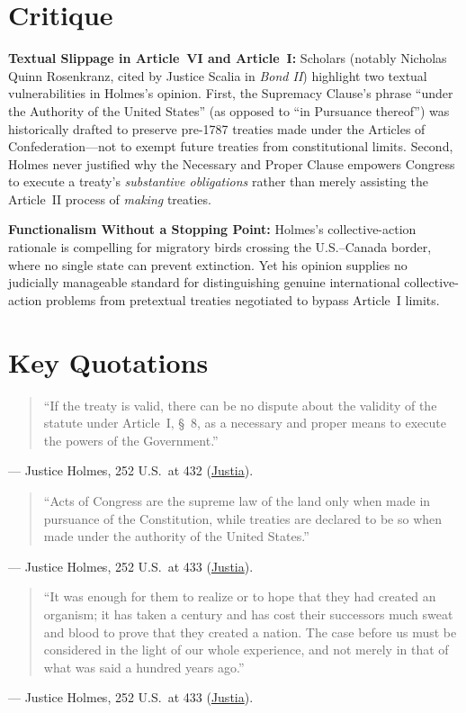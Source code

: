 \documentclass[12pt]{article}
\begin{document}
\section{Critique}
\textbf{Textual Slippage in Article~VI and Article~I:} Scholars (notably Nicholas Quinn Rosenkranz, cited by Justice Scalia in \textit{Bond II}) highlight two textual vulnerabilities in Holmes's opinion. First, the Supremacy Clause's phrase ``under the Authority of the United States'' (as opposed to ``in Pursuance thereof'') was historically drafted to preserve pre-1787 treaties made under the Articles of Confederation---not to exempt future treaties from constitutional limits. Second, Holmes never justified why the Necessary and Proper Clause empowers Congress to execute a treaty's \textit{substantive obligations} rather than merely assisting the Article~II process of \textit{making} treaties.

\textbf{Functionalism Without a Stopping Point:} Holmes's collective-action rationale is compelling for migratory birds crossing the U.S.--Canada border, where no single state can prevent extinction. Yet his opinion supplies no judicially manageable standard for distinguishing genuine international collective-action problems from pretextual treaties negotiated to bypass Article~I limits.

\section{Key Quotations}
\begin{quote}
``If the treaty is valid, there can be no dispute about the validity of the statute under Article~I, \S~8, as a necessary and proper means to execute the powers of the Government.''
\end{quote}
\noindent --- Justice Holmes, 252 U.S.\ at 432 (\href{https://supreme.justia.com/cases/federal/us/252/416/}{Justia}).

\begin{quote}
``Acts of Congress are the supreme law of the land only when made in pursuance of the Constitution, while treaties are declared to be so when made under the authority of the United States.''
\end{quote}
\noindent --- Justice Holmes, 252 U.S.\ at 433 (\href{https://supreme.justia.com/cases/federal/us/252/416/}{Justia}).

\begin{quote}
``It was enough for them to realize or to hope that they had created an organism; it has taken a century and has cost their successors much sweat and blood to prove that they created a nation. The case before us must be considered in the light of our whole experience, and not merely in that of what was said a hundred years ago.''
\end{quote}
\noindent --- Justice Holmes, 252 U.S.\ at 433 (\href{https://supreme.justia.com/cases/federal/us/252/416/}{Justia}).
\end{document}
